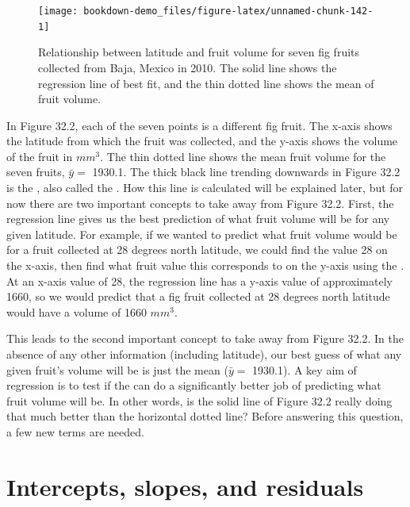 \documentclass[
  openany]{krantz}
\begin{document}
\begin{figure}
\texttt{[image: bookdown-demo\_files/figure-latex/unnamed-chunk-142-1]} \caption{Relationship between latitude and fruit volume for seven fig fruits collected from Baja, Mexico in 2010. The solid line shows the regression line of best fit, and the thin dotted line shows the mean of fruit volume.}\label{fig:unnamed-chunk-142}
\end{figure}

In Figure 32.2, each of the seven points is a different fig fruit.
The x-axis shows the latitude from which the fruit was collected, and the y-axis shows the volume of the fruit in \(mm^{3}\).
The thin dotted line shows the mean fruit volume for the seven fruits, \(\bar{y} =\) 1930.1.
The thick black line trending downwards in Figure 32.2 is the , also called the .
How this line is calculated will be explained later, but for now there are two important concepts to take away from Figure 32.2.
First, the regression line gives us the best prediction of what fruit volume will be for any given latitude.
For example, if we wanted to predict what fruit volume would be for a fruit collected at 28 degrees north latitude, we could find the value 28 on the x-axis, then find what fruit value this corresponds to on the y-axis using the .
At an x-axis value of 28, the regression line has a y-axis value of approximately 1660, so we would predict that a fig fruit collected at 28 degrees north latitude would have a volume of 1660 \(mm^{3}\).

This leads to the second important concept to take away from Figure 32.2.
In the absence of any other information (including latitude), our best guess of what any given fruit's volume will be is just the mean (\(\bar{y} =\) 1930.1).
A key aim of regression is to test if the  can do a significantly better job of predicting what fruit volume will be.
In other words, is the solid line of Figure 32.2 really doing that much better than the horizontal dotted line?
Before answering this question, a few new terms are needed.

\hypertarget{intercepts-slopes-and-residuals}{%
\section{Intercepts, slopes, and residuals}\label{intercepts-slopes-and-residuals}}
\end{document}
